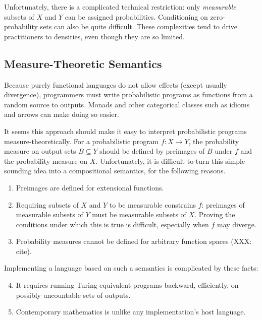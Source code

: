 \documentclass[preprint]{sigplanconf}
\begin{document}
Unfortunately, there is a complicated technical restriction: only \emph{measurable} subsets of $X$ and $Y$ can be assigned probabilities.
Conditioning on zero-probability sets can also be quite difficult.
These complexities tend to drive practitioners to densities, even though they are so limited.

\subsection{Measure-Theoretic Semantics}

Because purely functional languages do not allow effects (except usually divergence), programmers must write probabilistic programs as functions from a random source to outputs.
Monads and other categorical classes such as idioms and arrows can make doing so easier.

It seems this approach should make it easy to interpret probabilistic programs measure-theoretically.
For a probabilistic program $f : X \to Y$, the probability measure on output sets $B \subseteq Y$ should be defined by preimages of $B$ under $f$ and the probability measure on $X$.
Unfortunately, it is difficult to turn this simple-sounding idea into a compositional semantics, for the following reasons.
\begin{enumerate}
	\item Preimages are defined for extensional functions. \label{problem:observable-domain}
	\item Requiring subsets of $X$ and $Y$ to be measurable constrains $f$: preimages of measurable subsets of $Y$ must be measurable subsets of $X$. Proving the conditions under which this is true is difficult, especially when $f$ may diverge. \label{problem:measurability}
	\item Probability measures cannot be defined for arbitrary function spaces (XXX: cite). \label{problem:higher-orderness}
\end{enumerate}
Implementing a language based on such a semantics is complicated by these facts:
\begin{enumerate}
	\setcounter{enumi}{3}
	\item It requires running Turing-equivalent programs backward, efficiently, on possibly uncountable sets of outputs.\label{problem:backward-efficient}
	\item Contemporary mathematics is unlike any implementation's host language. \label{problem:different-language}
\end{enumerate}
\end{document}
